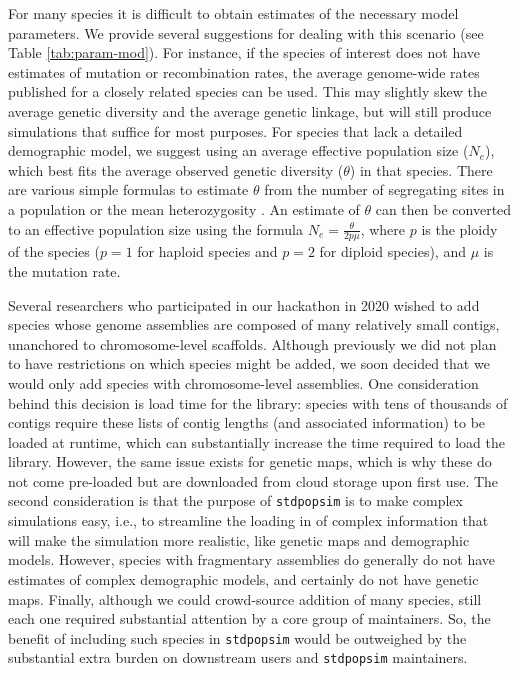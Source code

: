 \documentclass[hidelinks]{article}
\newcommand{\stdpopsim}{\texttt{stdpopsim}\xspace}
\begin{document}
For many species it is difficult to obtain estimates of the necessary model parameters.
We provide several suggestions for dealing with this scenario (see Table \ref{tab:param-mod}).
For instance, if the species of interest does not have estimates of mutation or recombination rates,
the average genome-wide rates published for a closely related species can be used.
This may slightly skew the average genetic diversity and the average genetic linkage,
but will still produce simulations that suffice for most purposes.
For species that lack a detailed demographic model,
we suggest using an average effective population size ($N_e$),
which best fits the average observed genetic diversity ($\theta$) in that species.
There are various simple formulas to estimate $\theta$ from the number of segregating sites in a population \citep{Watterson1975}
or the mean heterozygosity \citep{nei1979mathematical, tajima1983evolutionary}.
An estimate of $\theta$ can then be converted to an effective population size using the formula $N_e=\frac {\theta} {2p\mu}$,
where $p$ is the ploidy of the species ($p=1$ for haploid species and $p=2$ for diploid species), and $\mu$ is the mutation rate.


Several researchers who participated in our hackathon in 2020 wished to add species whose
genome assemblies are composed of many relatively small contigs, unanchored to chromosome-level scaffolds.
Although previously we did not plan to have restrictions on which species might be added,
we soon decided that we would only add species with chromosome-level assemblies.
One consideration behind this decision is load time for the library: species with tens of thousands of contigs
require these lists of contig lengths (and associated information) to be loaded at runtime,
which can substantially increase the time required to load the library.
However, the same issue exists for genetic maps,
which is why these do not come pre-loaded but are downloaded from cloud storage upon first use.
The second consideration is that the purpose of \stdpopsim is to make complex simulations easy,
i.e., to streamline the loading in of complex information that will make the simulation more realistic,
like genetic maps and demographic models.
However, species with fragmentary assemblies do generally do not have estimates of complex demographic models,
and certainly do not have genetic maps.
Finally, although we could crowd-source addition of many species,
still each one required substantial attention by a core group of maintainers.
So, the benefit of including such species in \stdpopsim would be outweighed
by the substantial extra burden on downstream users and \stdpopsim maintainers.
\end{document}
